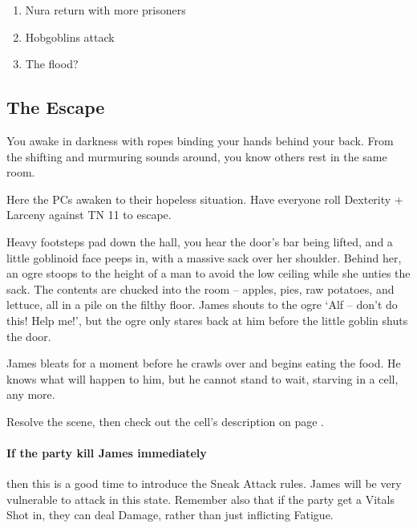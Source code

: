 \begin{multicols}{2}

\begin{enumerate}

	\item{Nura return with more prisoners}
	\item{Hobgoblins attack}
	\item{The flood?}

\end{enumerate}

\subsection{The Escape}
\label{escape}

\begin{boxtext}

	You awake in darkness with ropes binding your hands behind your back.
	From the shifting and murmuring sounds around, you know others rest in the same room.

\end{boxtext}

Here the PCs awaken to their hopeless situation.
Have everyone roll Dexterity + Larceny against TN 11 to escape.

\begin{boxtext}

	Heavy footsteps pad down the hall, you hear the door's bar being lifted, and a little goblinoid face peeps in, with a massive sack over her shoulder.
	Behind her, an ogre stoops to the height of a man to avoid the low ceiling while she unties the sack.
	The contents are chucked into the room -- apples, pies, raw potatoes, and lettuce, all in a pile on the filthy floor.
	James shouts to the ogre `Alf -- don't do this! Help me!', but the ogre only stares back at him before the little goblin shuts the door.

\end{boxtext}

James bleats for a moment before he crawls over and begins eating the food.
He knows what will happen to him, but he cannot stand to wait, starving in a cell, any more.

Resolve the scene, then check out the cell's description on page \pageref{entrycell}.

\paragraph{If the party kill James immediately}
then this is a good time to introduce the Sneak Attack rules.
James will be very vulnerable to attack in this state.
Remember also that if the party get a Vitals Shot in, they can deal Damage, rather than just inflicting Fatigue.


\end{multicols}
